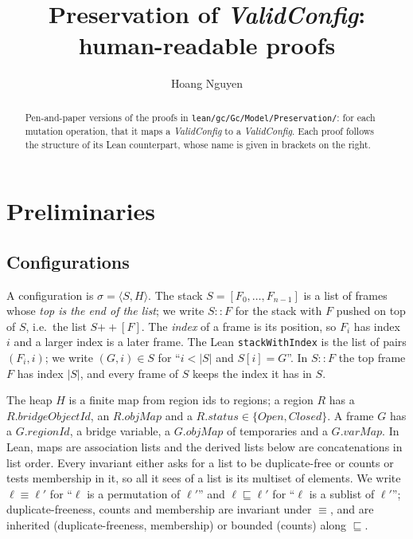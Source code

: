 \documentclass[11pt]{article}
\title{Preservation of \textit{ValidConfig}: human-readable proofs}
\author{Hoang Nguyen}
\date{}
\theoremstyle{definition}
\theoremstyle{remark}
\newcommand{\Open}{\mathit{Open}}
\newcommand{\Closed}{\mathit{Closed}}
\newcommand{\rid}{\mathit{regionId}}
\newcommand{\omap}{\mathit{objMap}}
\newcommand{\vmap}{\mathit{varMap}}
\newcommand{\bridge}{\mathit{bridgeObjectId}}
\newcommand{\status}{\mathit{status}}
\newcommand{\cat}{\mathbin{+\!\!+}}
\newcommand{\perm}{\equiv}
\newcommand{\sublist}{\sqsubseteq}
\newcommand{\inv}[1]{\textit{#1}}
\begin{document}
\maketitle

\begin{abstract}
Pen-and-paper versions of the proofs in \texttt{lean/gc/Gc/Model/Preservation/}: for each mutation
operation, that it maps a \inv{ValidConfig} to a \inv{ValidConfig}. Each proof follows the
structure of its Lean counterpart, whose name is given in brackets on the right.
\end{abstract}

\tableofcontents

\section{Preliminaries}

\subsection{Configurations}

A configuration is $\sigma = \langle S, H\rangle$. The stack $S = [F_0, \dots, F_{n-1}]$ is a list of
frames whose \emph{top is the end of the list}; we write $S :: F$ for the stack with $F$ pushed on top
of $S$, i.e.\ the list $S \cat [F]$. The \emph{index} of a frame is its position, so $F_i$ has index
$i$ and a larger index is a later frame. The Lean \texttt{stackWithIndex} is the list of pairs
$(F_i, i)$; we write $(G, i) \in S$ for ``$i < |S|$ and $S[i] = G$''. In $S :: F$ the top frame $F$
has index $|S|$, and every frame of $S$ keeps the index it has in $S$.

The heap $H$ is a finite map from region ids to regions; a region $R$ has a $R.\bridge$, an
$R.\omap$ and a $R.\status \in \{\Open, \Closed\}$. A frame $G$ has a $G.\rid$, a bridge variable,
a $G.\omap$ of temporaries and a $G.\vmap$. In Lean, maps are association lists and the derived lists
below are concatenations in list order. Every invariant either asks for a list to be duplicate-free or
counts or tests membership in it, so all it sees of a list is its multiset of elements. We write
$\ell \perm \ell'$ for ``$\ell$ is a permutation of $\ell'$'' and $\ell \sublist \ell'$ for ``$\ell$
is a sublist of $\ell'$''; duplicate-freeness, counts and membership are invariant under $\perm$, and
are inherited (duplicate-freeness, membership) or bounded (counts) along $\sublist$.
\end{document}
